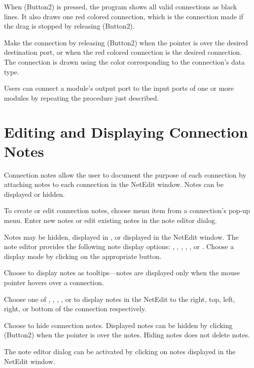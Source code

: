 When \keyboard(Button2) is pressed, the program shows all valid connections as black
lines.  It also draws one red colored connection, which is the
connection made if the drag is stopped by releasing \keyboard(Button2).

Make the connection by releasing \keyboard(Button2) when the pointer is over the
desired destination port, or when the red colored connection is the
desired connection.  The connection is drawn using the color
corresponding to the connection's data type.

Users can connect a module's output port to the input ports of one or more
modules by repeating the procedure just described.

\section{Editing and Displaying Connection Notes}
\label{sec:displaynotes}

Connection notes allow the user to document the purpose of
each connection by attaching notes to each connection in the NetEdit window.
Notes can be displayed or hidden.

To create or edit connection notes, choose menu item  from
a connection's pop-up menu. Enter new notes or edit existing notes in
the note editor dialog.

Notes may be hidden, displayed in , or displayed in the
NetEdit window.  The note editor provides the following note display
options: , , ,
, , or .  Choose a
display mode by clicking  on the appropriate button.

Choose  to display notes as tooltips---notes are
displayed only when the mouse pointer hovers over a connection.

Choose one of , , ,
, or  to display notes in the
NetEdit to the right, top, left, right, or bottom of the connection
respectively. 

Choose  to hide connection notes.  Displayed notes can be
hidden by clicking \keyboard(Button2) when the pointer is over the
notes.  Hiding notes does not delete notes.

The note editor dialog can be activated by clicking 
on notes displayed in the NetEdit window.

